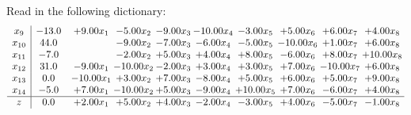 \documentclass[9pt]{article}
\begin{document}
Read in the following dictionary:
\[\begin{array}{c| c c@{\hskip 2pt} c@{\hskip 2pt} c@{\hskip 2pt} c@{\hskip 2pt} c@{\hskip 2pt} c@{\hskip 2pt} c@{\hskip 2pt} c@{\hskip 2pt} }
 x_{9}   &  -13.0 & +  9.00 x_{1} & -5.00 x_{2} & -9.00 x_{3} & -10.00 x_{4} & -3.00 x_{5} & +  5.00 x_{6} & +  6.00 x_{7} & +  4.00 x_{8}\\
 x_{10}   &  44.0  &   & -9.00 x_{2} & -7.00 x_{3} & -6.00 x_{4} & -5.00 x_{5} & -10.00 x_{6} & +  1.00 x_{7} & +  6.00 x_{8}\\
 x_{11}   &  -7.0  &   & -2.00 x_{2} & +  5.00 x_{3} & +  4.00 x_{4} & +  8.00 x_{5} & -6.00 x_{6} & +  8.00 x_{7} & + 10.00 x_{8}\\
 x_{12}   &  31.0 & -9.00 x_{1} & -10.00 x_{2} & -2.00 x_{3} & +  3.00 x_{4} & +  3.00 x_{5} & +  7.00 x_{6} & -10.00 x_{7} & +  6.00 x_{8}\\
 x_{13}   &  0.0 & -10.00 x_{1} & +  3.00 x_{2} & +  7.00 x_{3} & -8.00 x_{4} & +  5.00 x_{5} & +  6.00 x_{6} & +  5.00 x_{7} & +  9.00 x_{8}\\
 x_{14}   &  -5.0 & +  7.00 x_{1} & -10.00 x_{2} & +  5.00 x_{3} & -9.00 x_{4} & + 10.00 x_{5} & +  7.00 x_{6} & -6.00 x_{7} & +  4.00 x_{8}\\
\hline
z    &  0.0 & +  2.00 x_{1} & +  5.00 x_{2} & +  4.00 x_{3} & -2.00 x_{4} & -3.00 x_{5} & +  4.00 x_{6} & -5.00 x_{7} & -1.00 x_{8}\\
\end{array}\]
\end{document}
